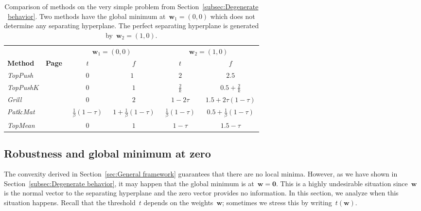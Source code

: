 \documentclass[11pt,a4paper]{article}
\theoremstyle{definition}
\newcommand{\toppush}{\textit{TopPush}\xspace}
\newcommand{\toppushk}{\textit{TopPush$K$}\xspace}
\newcommand{\grill}{\textit{Grill}\xspace}
\newcommand{\patmat}{\textit{Pat}\textup{\&}\textit{Mat}\xspace}
\newcommand{\topmean}{\textit{TopMean}\xspace}
\begin{document}
\begin{table}[!ht]
  \caption{Comparison of methods on the very simple problem from Section~\ref{subsec:Degenerate behavior}. Two methods have the global minimum at~$\bm{w}_1=(0,0)$ which does not determine any separating hyperplane. The perfect separating hyperplane is generated by~$\bm{w}_2=(1,0).$}
  \label{tab:example}
  \centering
  \begin{tabular}{@{} lccccc @{}}
    \toprule
               &                       & \multicolumn{2}{c}{$\bm{w}_1 = (0,0)$} & \multicolumn{2}{c}{$\bm{w}_2=(1,0)$} \\
    \cmidrule(lr){3-4} \cmidrule(lr){5-6}
    \bf Method & \bf Page              &~$t$                                    &~$f$                                     &~$t$                       &~$f$ \\
    \midrule
    \toppush   & \pageref{eq:TopPush}  &~$0$                                    & \cellcolor{myred!75}$1$                 &~$2$                       &~$2.5$ \\
    \toppushk  & \pageref{eq:TopPushK} &~$0$                                    &~$1$                                     &~$\frac2k$                 & \cellcolor{mygreen!75}~$0.5+\frac2k$ \\
    \grill     & \pageref{eq:Grill}    &~$0$                                    &~$2$                                     &~$1-2\tau$                 & \cellcolor{mygreen!75}~$1.5+2\tau(1-\tau)$ \\
    \patmat    & \pageref{eq:PatMat}   &~$\frac{1}{\beta}(1-\tau)$              &~$1+\frac{1}{\beta}(1-\tau)$             &~$\frac{1}{\beta}(1-\tau)$ & \cellcolor{mygreen!75}~$0.5+\frac{1}{\beta}(1-\tau)$ \\
    \topmean   & \pageref{eq:TopMean}  &~$0$                                    & \cellcolor{myred!75}~$1$                &~$1-\tau$                  &~$1.5-\tau$ \\
    \bottomrule
  \end{tabular}
\end{table}


\subsection{Robustness and global minimum at zero}\label{subsec:Robustness and global minimum at zero}

The convexity derived in Section~\ref{sec:General framework} guarantees that there are no local minima. However, as we have shown in Section~\ref{subsec:Degenerate behavior}, it may happen that the global minimum is at~$\bm{w} = \bm{0}.$ This is a highly undesirable situation since~$\bm{w}$ is the normal vector to the separating hyperplane and the zero vector provides no information. In this section, we analyze when this situation happens. Recall that the threshold~$t$ depends on the weights~$\bm{w}$; sometimes we stress this by writing~$t(\bm{w}).$
\end{document}
